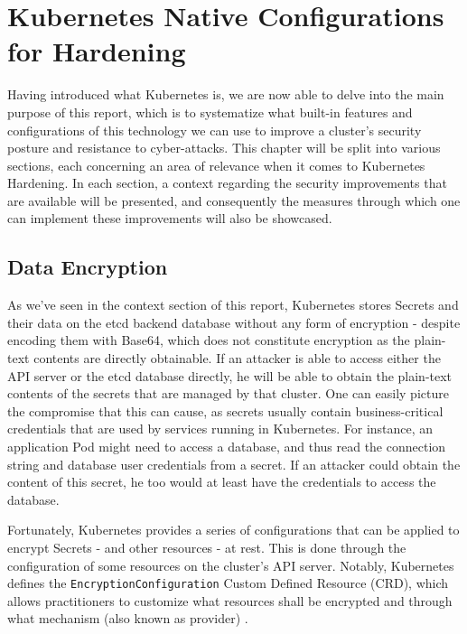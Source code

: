 \documentclass[a4paper,11pt,openright,BCOR=15mm]{scrbook}
\begin{document}
\chapter{Kubernetes Native Configurations for Hardening}
Having introduced what Kubernetes is, we are now able to delve into the main purpose of this report, which is to systematize what built-in features and configurations of this technology we can use to improve a cluster's security posture and resistance to cyber-attacks.
This chapter will be split into various sections, each concerning an area of relevance when it comes to Kubernetes Hardening. In each section, a context regarding the security improvements that are available will be presented, and consequently the measures through which one can implement these improvements will also be showcased.

	\section{Data Encryption}\label{sect:data}
	
As we've seen in the context section of this report, Kubernetes stores Secrets and their data on the etcd backend database without any form of encryption \cite{the_linux_foundation_secrets_2024} - despite encoding them with Base64, which does not constitute encryption as the plain-text contents are directly obtainable. If an attacker is able to access either the API server or the etcd database directly, he will be able to obtain the plain-text contents of the secrets that are managed by that cluster. One can easily picture the compromise that this can cause, as secrets usually contain business-critical credentials that are used by services running in Kubernetes. For instance, an application Pod might need to access a database, and thus read the connection string and database user credentials from a secret. If an attacker could obtain the content of this secret, he too would at least have the credentials to access the database.

Fortunately, Kubernetes provides a series of configurations that can be applied to encrypt Secrets - and other resources - at rest. This is done through the configuration of some resources on the cluster's API server. Notably, Kubernetes defines the \texttt{EncryptionConfiguration} Custom Defined Resource (CRD), which allows practitioners to customize what resources shall be encrypted and through what mechanism (also known as provider) \cite{the_linux_foundation_encrypting_2024}.
\end{document}
